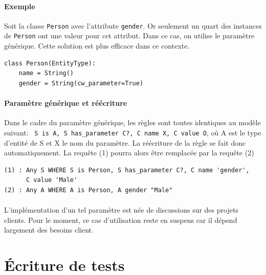 \documentclass {report}
\begin{document}
\paragraph{Exemple}
Soit la classe \verb+Person+ avec l'attribute \verb+gender+. Or seulement un quart des instances de \verb+Person+ ont une valeur pour cet attribut. Dans ce cas, on utilise le paramètre générique. Cette solution est plus efficace dans ce contexte.


\begin{lstlisting}[caption= L'entité Person]
class Person(EntityType):
    name = String()
    gender = String(cw_parameter=True)
\end{lstlisting}

\paragraph{Paramètre générique et réécriture}
Dans le cadre du paramètre générique, les règles sont toutes identiques au modèle suivant: \verb+ S is A, S has_parameter C?, C name X, C value O+, où A est le type d'entité de S et X le nom du paramètre. La réécriture de la règle se fait donc automatiquement. La requête (1) pourra alors être remplacée par la requête (2)

\renewcommand{\lstlistingname}{Requête}
\begin{lstlisting}[caption= Paramètre générique et réécriture]
(1) : Any S WHERE S is Person, S has_parameter C?, C name 'gender',
      C value 'Male'
(2) : Any A WHERE A is Person, A gender "Male"
\end{lstlisting}

\paragraph{}
L'implémentation d'un tel paramètre est née de discussions sur des projets clients. Pour le moment, ce cas d'utilisation reste en suspens car il dépend largement des besoins client.

\section{Écriture de tests}
\end{document}
